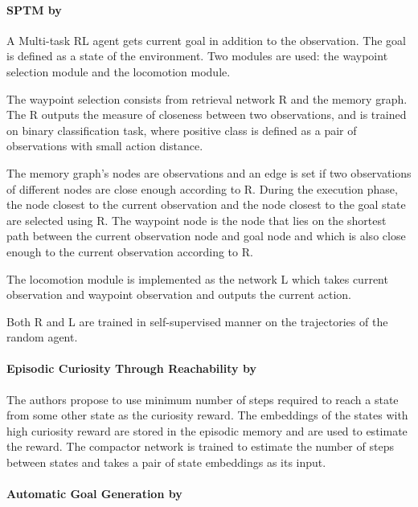 \documentclass[acmsmall, nonacm]{acmart}
\begin{document}

\paragraph{SPTM by~\citet{savinov2018semiparametric}} %
\label{par:sptm}

A Multi-task RL agent gets current goal in addition to the observation. The goal is defined as a state of the environment. Two modules are used: the waypoint selection module and the locomotion module.

The waypoint selection consists from retrieval network R and the memory graph. The R outputs the measure of closeness between two observations, and is trained on binary classification task, where positive class is defined as a pair of observations with small action distance.

The memory graph's nodes are observations and an edge is set if two observations of different nodes are close enough according to R. During the execution phase, the node closest to the current observation and the node closest to the goal state are selected using R. The waypoint node is the node that lies on the shortest path between the current observation node and goal node and which is also close enough to the current observation according to R.

The locomotion module is implemented as the network L which takes current observation and waypoint observation and outputs the current action.

Both R and L are trained in self-supervised manner on the trajectories of the random agent.


\paragraph{Episodic Curiosity Through Reachability by \citet{savinov2018episodic}}

The authors propose to use minimum number of steps required to reach a state from some other state as the curiosity reward. The embeddings of the states with high curiosity reward are stored in the episodic memory and are used to estimate the reward. The compactor network is trained to estimate the number of steps between states and takes a pair of state embeddings as its input.


\paragraph{Automatic Goal Generation by \citet{pmlr-v80-florensa18a}}
\end{document}
